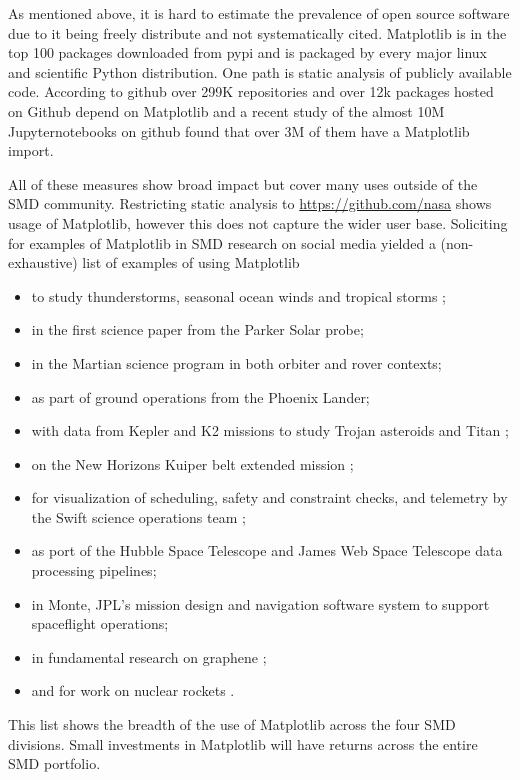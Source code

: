 \documentclass[12pt]{article}
\numberwithin{page}{section}
\begin{document}
As mentioned above, it is hard to estimate the prevalence of open
source software due to it being freely distribute and not
systematically cited.  Matplotlib is in the top 100 packages
downloaded from pypi\cite{pypi_stats} and is packaged by every major
linux and scientific Python distribution.  One path is static analysis
of publicly available code.  According to github over 299K
repositories and over 12k packages hosted on Github depend on
Matplotlib\cite{gh_deps:2021} and a recent study of the almost 10M
Jupyternotebooks on github found that over 3M of them have a
Matplotlib import\cite{datalore:2020}.

All of these measures show broad impact but cover many uses outside of
the SMD community.  Restricting static analysis to
\url{https://github.com/nasa} shows usage of Matplotlib, however this
does not capture the wider user base.  Soliciting for examples of
Matplotlib in SMD research on social media yielded a (non-exhaustive)
list of examples of using Matplotlib
\begin{itemize}
\item
  to study
  thunderstorms\cite{https://doi.org/10.1002/2016JD025299,https://doi.org/10.1029/2019JD030874},
  seasonal ocean winds \cite{https://doi.org/10.1002/2017JD027516} and
  tropical storms \cite{Lang_2020};
\item in the first science paper from the Parker Solar
  probe\cite{Bale2019};
\item in the Martian science program in both orbiter
  \cite{https://doi.org/10.1029/2019JE006188} and
  rover\cite{https://doi.org/10.1002/2016EA000219} contexts;
\item as part of ground operations from the Phoenix Lander;
\item with data from Kepler and K2 missions to study Trojan
  asteroids\cite{Nixon_2019} and Titan
  \cite{Ryan_2017,2019PASP..131h4505P};
\item on the New Horizons Kuiper belt extended mission
  \cite{Porter_2018};
\item for visualization of scheduling, safety and constraint checks,
  and telemetry by the Swift science operations team
  \cite{swift_ops,2020ApJ...900...35T};
\item as port of the Hubble Space Telescope and James Web Space
  Telescope data processing pipelines;
\item in Monte, JPL's mission design
  and navigation software system to support spaceflight operations;
\item in fundamental research on graphene \cite{PhysRevLett.120.236802};
\item and for work on nuclear rockets \cite{leu_cerment}.
\end{itemize}
This list shows the breadth of the use of Matplotlib across the
four SMD divisions.  Small investments in Matplotlib will have returns
across the entire SMD portfolio.
\end{document}
